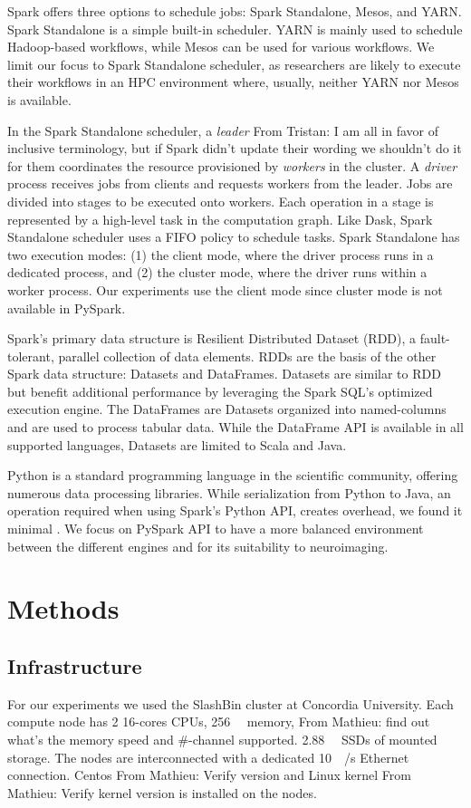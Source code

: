 \documentclass[conference]{IEEEtran}
\newcommand{\TG}[1]{\color{cyan}From Tristan: #1 \color{black}}
\newcommand{\MD}[1]{\color{magenta}From Mathieu: #1 \color{black}}
\begin{document}
Spark offers three options to schedule jobs: Spark Standalone, Mesos, and YARN.
Spark Standalone is a simple built-in scheduler.
YARN is mainly used to schedule Hadoop-based workflows, while Mesos can be used for various workflows.
We limit our focus to Spark Standalone scheduler, as researchers are likely to execute their workflows in an HPC environment where, usually, neither YARN nor Mesos is available.

In the Spark Standalone scheduler, a \textit{leader} \TG{I am all in favor of inclusive terminology, but if Spark didn't update their wording we shouldn't do it for them} coordinates the resource provisioned by \textit{workers} in the cluster.
A \textit{driver}  process receives jobs from clients and requests workers from the leader.
Jobs are divided into stages to be executed onto workers.
Each operation in a stage is represented by a high-level task in the computation graph.
Like Dask, Spark Standalone scheduler uses a FIFO policy to schedule tasks.
Spark Standalone has two execution modes: (1) the client mode, where the driver process runs in a dedicated process,
and (2) the cluster mode, where the driver runs within a worker process.
Our experiments use the client mode since cluster mode is not available in PySpark.

Spark's primary data structure is Resilient Distributed Dataset (RDD)\cite{RDD}, a fault-tolerant, parallel collection of data elements.
RDDs are the basis of the other Spark data structure: Datasets and DataFrames.
Datasets are similar to RDD but benefit additional performance by leveraging the Spark SQL's optimized execution engine. 
The DataFrames are Datasets organized into named-columns and are used to process tabular data. 
While the DataFrame API is available in all supported languages, Datasets are limited to Scala and Java. 

Python is a standard programming language in the scientific community, offering numerous data processing libraries.
While serialization from Python to Java, an operation required when using Spark's Python API, creates overhead, we found it minimal \cite{8943502}.
We focus on PySpark API to have a more balanced environment between the different engines and for its suitability to neuroimaging.

\section{Methods}
\subsection{Infrastructure}
For our experiments we used the SlashBin cluster at Concordia University.
Each compute node has 2 16-cores CPUs,
\SI{256}{\giga\byte} memory, \MD{find out what's the memory speed and \#-channel supported.}
\SI{2.88}{\tera\byte} SSDs of mounted storage.
The nodes are interconnected with a dedicated \SI{10}{\giga\bit/\second} Ethernet connection.
Centos \MD{Verify version} and Linux kernel \MD{Verify kernel version} is installed on the nodes.
\end{document}
